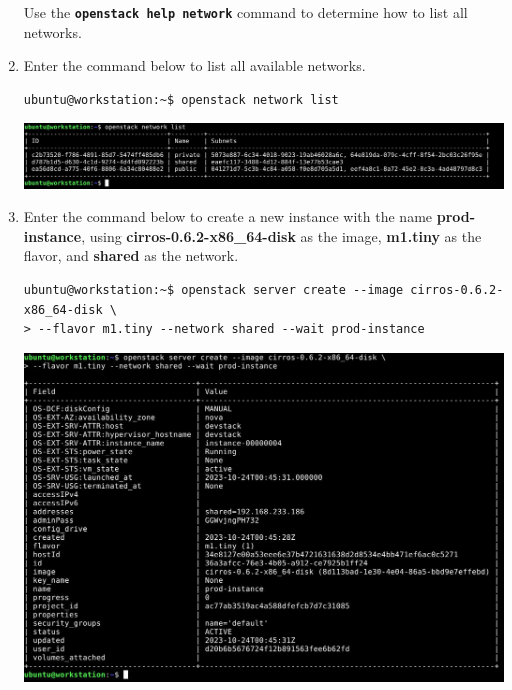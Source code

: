 \documentclass[letterpaper, 12pt]{article}
\begin{document}
\begin{enumerate}
    \begin{tipbox}{}
        Use the \textbf{\texttt{openstack help network}} command to determine how to list all networks.
    \end{tipbox}

    \item Enter the command below to list all available networks.
\begin{lstlisting}
ubuntu@workstation:~$ openstack network list
\end{lstlisting}

    \begin{center}
        \includegraphics[width=\linewidth]{images/part_2_step_11.png}
    \end{center}

    \item Enter the command below to create a new instance with the name \textbf{prod-instance}, using
    \textbf{cirros-0.6.2-x86\_64-disk} as the image, \textbf{m1.tiny} as the flavor, and \textbf{shared} as the network.
\begin{lstlisting}
ubuntu@workstation:~$ openstack server create --image cirros-0.6.2-x86_64-disk \
> --flavor m1.tiny --network shared --wait prod-instance
\end{lstlisting}

    \begin{center}
        \includegraphics[width=\linewidth]{images/part_2_step_12.png}
    \end{center}


\end{enumerate}
\end{document}
